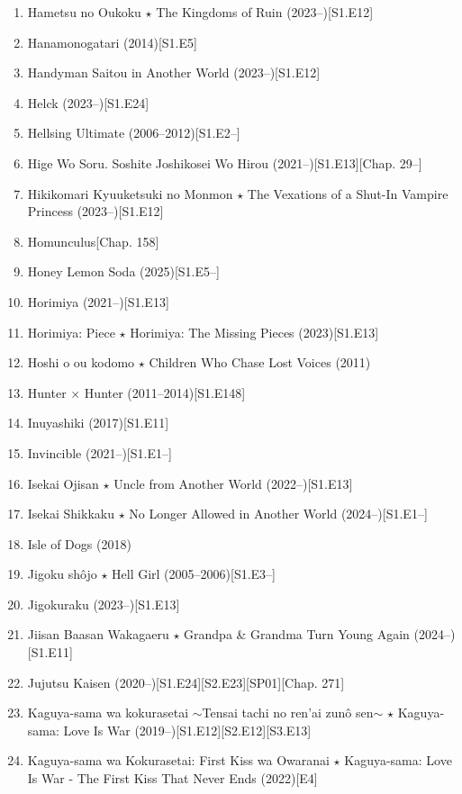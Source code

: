 \documentclass{article}
\begin{document}
\begin{enumerate}
    \item {\sc Hametsu no Oukoku $\star$ The Kingdoms of Ruin} (2023--)\hfill[S1.E12]
    \item {\sc Hanamonogatari} (2014)\hfill[S1.E5]
    \item {\sc Handyman Saitou in Another World} (2023--)\hfill[S1.E12]
    \item {\sc Helck} (2023--)\hfill[S1.E24]
    \item Hellsing Ultimate (2006--2012)\hfill[S1.E2--]
    \item {\sc Hige Wo Soru. Soshite Joshikosei Wo Hirou} (2021--)\hfill[S1.E13][Chap. 29--]
    \item {\sc Hikikomari Kyuuketsuki no Monmon $\star$ The Vexations of a Shut-In Vampire Princess} (2023--)\hfill[S1.E12]
    \item {\sc Homunculus}\hfill[Chap. 158]
    \item Honey Lemon Soda (2025)\hfill[S1.E5--]
    \item {\sc Horimiya} (2021--)\hfill[S1.E13]
    \item {\sc Horimiya: Piece $\star$ Horimiya: The Missing Pieces} (2023)\hfill[S1.E13]
    \item {\sc Hoshi o ou kodomo $\star$ Children Who Chase Lost Voices} (2011)
    \item {\sc Hunter $\times$ Hunter} (2011--2014)\hfill[S1.E148]
    \item {\sc Inuyashiki} (2017)\hfill[S1.E11]
    \item Invincible (2021--)\hfill[S1.E1--]
    \item Isekai Ojisan $\star$ Uncle from Another World (2022--)\hfill[S1.E13]
    \item Isekai Shikkaku $\star$ No Longer Allowed in Another World (2024--)\hfill[S1.E1--]
    \item {\sc Isle of Dogs} (2018)
    \item Jigoku shôjo $\star$ Hell Girl (2005--2006)\hfill[S1.E3--]
    \item Jigokuraku (2023--)\hfill[S1.E13]
    \item {\sc Jiisan Baasan Wakagaeru $\star$ Grandpa \& Grandma Turn Young Again} (2024--)\hfill[S1.E11]
    \item {\sc Jujutsu Kaisen} (2020--)\hfill[S1.E24][S2.E23][SP01][Chap. 271]
    \item Kaguya-sama wa kokurasetai $\sim$Tensai tachi no ren'ai zun\^o sen$\sim$ $\star$ Kaguya-sama: Love Is War (2019--)\hfill[S1.E12][S2.E12][S3.E13]
    \item {\sc Kaguya-sama wa Kokurasetai: First Kiss wa Owaranai $\star$ Kaguya-sama: Love Is War - The First Kiss That Never Ends} (2022)\hfill[E4]

\end{enumerate}
\end{document}
